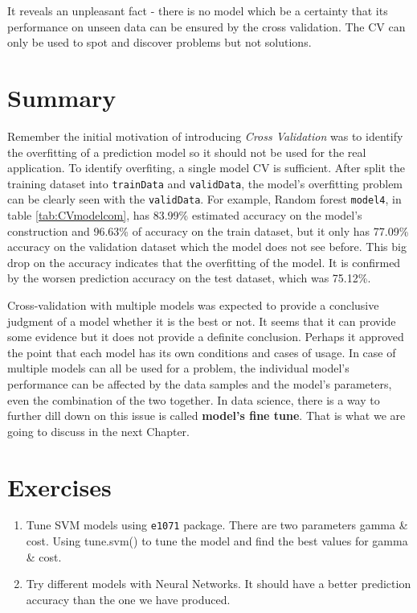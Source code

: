 \documentclass[
]{book}
\begin{document}
It reveals an unpleasant fact - there is no model which be a certainty that its performance on unseen data can be ensured by the cross validation. The CV can only be used to spot and discover problems but not solutions.

\hypertarget{summary-8}{%
\section*{Summary}\label{summary-8}}


Remember the initial motivation of introducing \emph{Cross Validation} was to identify the overfitting of a prediction model so it should not be used for the real application. To identify overfiting, a single model CV is sufficient. After split the training dataset into \texttt{trainData} and \texttt{validData}, the model's overfitting problem can be clearly seen with the \texttt{validData}. For example, Random forest \texttt{model4}, in table \ref{tab:CVmodelcom}, has 83.99\% estimated accuracy on the model's construction and 96.63\% of accuracy on the train dataset, but it only has 77.09\% accuracy on the validation dataset which the model does not see before. This big drop on the accuracy indicates that the overfitting of the model. It is confirmed by the worsen prediction accuracy on the test dataset, which was 75.12\%.

Cross-validation with multiple models was expected to provide a conclusive judgment of a model whether it is the best or not. It seems that it can provide some evidence but it does not provide a definite conclusion. Perhaps it approved the point that each model has its own conditions and cases of usage. In case of multiple models can all be used for a problem, the individual model's performance can be affected by the data samples and the model's parameters, even the combination of the two together. In data science, there is a way to further dill down on this issue is called \textbf{model's fine tune}. That is what we are going to discuss in the next Chapter.

\hypertarget{exercises-7}{%
\section*{Exercises}\label{exercises-7}}


\begin{enumerate}
\def\labelenumi{\arabic{enumi}.}
\item
  Tune SVM models using \texttt{e1071} package. There are two parameters gamma \& cost. Using tune.svm() to tune the model and find the best values for gamma \& cost.
\item
  Try different models with Neural Networks. It should have a better prediction accuracy than the one we have produced.
\end{enumerate}
\end{document}
